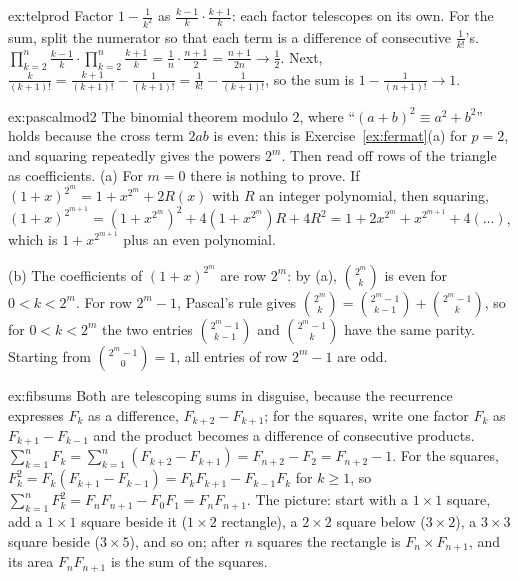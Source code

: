 \begin{solution}{ex:telprod}
\idea Factor $1-\frac1{k^2}$ as $\frac{k-1}k\cdot\frac{k+1}k$: each factor telescopes on its own. For the sum, split the numerator so that each term is a difference of consecutive $\frac1{k!}$'s.
\writeup $\prod_{k=2}^n\frac{k-1}k\cdot\prod_{k=2}^n\frac{k+1}k=\frac1n\cdot\frac{n+1}2=\frac{n+1}{2n}\to\frac12$.
Next, $\frac k{(k+1)!}=\frac{k+1}{(k+1)!}-\frac1{(k+1)!}=\frac1{k!}-\frac1{(k+1)!}$, so the sum is $1-\frac1{(n+1)!}\to1$.
\end{solution}

\begin{solution}{ex:pascalmod2}
\idea The binomial theorem modulo $2$, where ``$(a+b)^2\equiv a^2+b^2$'' holds because the cross term $2ab$ is even: this is Exercise~\ref{ex:fermat}(a) for $p=2$, and squaring repeatedly gives the powers $2^m$. Then read off rows of the triangle as coefficients.
\writeup (a) For $m=0$ there is nothing to prove. If $(1+x)^{2^m}=1+x^{2^m}+2R(x)$ with $R$ an integer polynomial, then squaring,
$(1+x)^{2^{m+1}}=(1+x^{2^m})^2+4(1+x^{2^m})R+4R^2=1+2x^{2^m}+x^{2^{m+1}}+4(\dots)$, which is $1+x^{2^{m+1}}$ plus an even polynomial.

(b) The coefficients of $(1+x)^{2^m}$ are row $2^m$: by (a), $\binom{2^m}k$ is even for $0<k<2^m$. For row $2^m-1$, Pascal's rule gives $\binom{2^m}k=\binom{2^m-1}{k-1}+\binom{2^m-1}k$, so for $0<k<2^m$ the two entries $\binom{2^m-1}{k-1}$ and $\binom{2^m-1}k$ have the same parity. Starting from $\binom{2^m-1}0=1$, all entries of row $2^m-1$ are odd.
\end{solution}

\begin{solution}{ex:fibsums}
\idea Both are telescoping sums in disguise, because the recurrence expresses $F_k$ as a difference, $F_{k+2}-F_{k+1}$; for the squares, write one factor $F_k$ as $F_{k+1}-F_{k-1}$ and the product becomes a difference of consecutive products.
\writeup $\sum_{k=1}^nF_k=\sum_{k=1}^n(F_{k+2}-F_{k+1})=F_{n+2}-F_2=F_{n+2}-1$.
For the squares, $F_k^2=F_k(F_{k+1}-F_{k-1})=F_kF_{k+1}-F_{k-1}F_k$ for $k\ge1$, so $\sum_{k=1}^nF_k^2=F_nF_{n+1}-F_0F_1=F_nF_{n+1}$.
The picture: start with a $1\times1$ square, add a $1\times1$ square beside it ($1\times2$ rectangle), a $2\times2$ square below ($3\times2$), a $3\times3$ square beside ($3\times5$), and so on; after $n$ squares the rectangle is $F_n\times F_{n+1}$, and its area $F_nF_{n+1}$ is the sum of the squares.
\end{solution}

